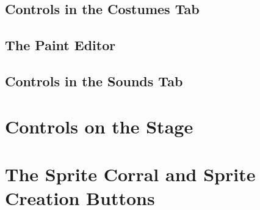 \documentclass{report}
\begin{document}
\subsection{Controls in the Costumes Tab}
\subsection{The Paint Editor}
\subsection{Controls in the Sounds Tab}
\section{Controls on the Stage}
\section{The Sprite Corral and Sprite Creation Buttons}
\end{document}
